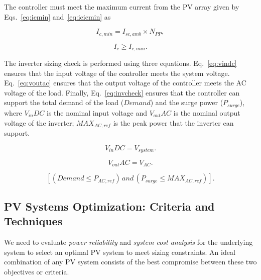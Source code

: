 \documentclass[journal]{IEEEtran}
\begin{document}
The controller must meet the maximum current from the PV array given by Eqs.~\eqref{eq:icmin} and~\eqref{eq:icicmin} as

\begin{equation}
\label{eq:icmin}
I_{c,min} = I_{sc,amb} \times N_{PP},
\end{equation}

\begin{equation}
\label{eq:icicmin}
I_{c} \geq I_{c,min}.
\end{equation}

The inverter sizing check is performed using three equations. Eq.~\eqref{eq:vindc} ensures that 
the input voltage of the controller meets the system voltage. Eq.~\eqref{eq:voutac} ensures that the 
output voltage of the controller meets the AC voltage of the load. Finally, Eq.~\eqref{eq:invcheck} ensures that 
the controller can support the total demand of the load ($Demand$) and the surge power ($P_{surge}$), 
where $V_{in}DC$ is the nominal input voltage and $V_{out}AC$ is the nominal output voltage of the inverter; 
$MAX_{AC,ref}$ is the peak power that the inverter can support.

\begin{equation}
\label{eq:vindc} 
V_{in}DC = V_{system}.
\end{equation}

\begin{equation}
\label{eq:voutac} 
V_{out}AC = V_{AC}.
\end{equation}

\begin{equation}
\label{eq:invcheck} 
\left[ (Demand \leq P_{AC,ref}) \, and \, (P_{surge} \leq MAX_{AC,ref}) \right].
\end{equation}

\subsection{PV Systems Optimization: Criteria and Techniques}

We need to evaluate \textit{power reliability} and \textit{system cost analysis} for the underlying system to select an optimal PV system to meet sizing constraints. An ideal combination of any PV system consists of the best compromise between these two objectives or criteria.
\end{document}
